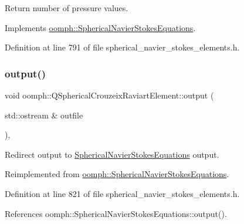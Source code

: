 Return number of pressure values. 



Implements \hyperlink{classoomph_1_1SphericalNavierStokesEquations_ae01203564bc66dacf84c1ed65e4b7930}{oomph\+::\+Spherical\+Navier\+Stokes\+Equations}.



Definition at line 791 of file spherical\+\_\+navier\+\_\+stokes\+\_\+elements.\+h.

\mbox{\label{classoomph_1_1QSphericalCrouzeixRaviartElement_a2e829acc8cb74c743a661b63fb1aa618}} 
\subsubsection{\texorpdfstring{output()}{output()}\hspace{0.1cm}{\footnotesize\ttfamily [1/4]}}
{\footnotesize\ttfamily void oomph\+::\+Q\+Spherical\+Crouzeix\+Raviart\+Element\+::output (\begin{DoxyParamCaption}\item[{std\+::ostream \&}]{outfile }\end{DoxyParamCaption})\hspace{0.3cm}{\ttfamily [inline]}, {\ttfamily [virtual]}}



Redirect output to \hyperlink{classoomph_1_1SphericalNavierStokesEquations}{Spherical\+Navier\+Stokes\+Equations} output. 



Reimplemented from \hyperlink{classoomph_1_1SphericalNavierStokesEquations_a1d08588d3d9462de04d447506af5cdd5}{oomph\+::\+Spherical\+Navier\+Stokes\+Equations}.



Definition at line 821 of file spherical\+\_\+navier\+\_\+stokes\+\_\+elements.\+h.



References oomph\+::\+Spherical\+Navier\+Stokes\+Equations\+::output().

\mbox{\label{classoomph_1_1QSphericalCrouzeixRaviartElement_a23d3c82c7dbb8c220b433d2836707136}} 
